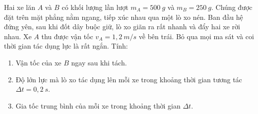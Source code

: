 \begin{vidu}
Hai xe lăn $A$ và $B$ có khối lượng lần lượt $m_A = 500\ g$ và $m_B = 250\ g$. Chúng được đặt trên mặt phẳng nằm ngang, tiếp xúc nhau qua một lò xo nén. Ban đầu hệ đứng yên, sau khi đốt dây buộc giữ, lò xo giãn ra rất nhanh và đẩy hai xe rời nhau. Xe $A$ thu được vận tốc $v_A = 1,2\ m/s$ về bên trái. Bỏ qua mọi ma sát và coi thời gian tác dụng lực là rất ngắn. Tính:
\begin{enumerate}
\item Vận tốc của xe $B$ ngay sau khi tách.
\item Độ lớn lực mà lò xo tác dụng lên mỗi xe trong khoảng thời gian tương tác $\Delta t = 0,2\ s$.
\item Gia tốc trung bình của mỗi xe trong khoảng thời gian $\Delta t$.
\end{enumerate}

\end{vidu}

